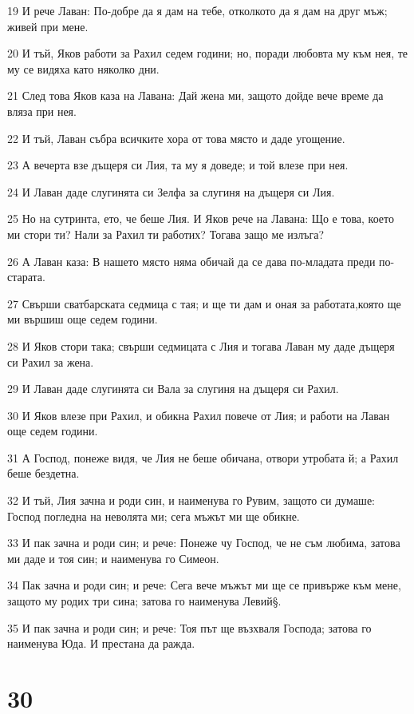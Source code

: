 \par 19 И рече Лаван: По-добре да я дам на тебе, отколкото да я дам на друг мъж; живей при мене.
\par 20 И тъй, Яков работи за Рахил седем години; но, поради любовта му към нея, те му се видяха като няколко дни.
\par 21 След това Яков каза на Лавана: Дай жена ми, защото дойде вече време да вляза при нея.
\par 22 И тъй, Лаван събра всичките хора от това място и даде угощение.
\par 23 А вечерта взе дъщеря си Лия, та му я доведе; и той влезе при нея.
\par 24 И Лаван даде слугинята си Зелфа за слугиня на дъщеря си Лия.
\par 25 Но на сутринта, ето, че беше Лия. И Яков рече на Лавана: Що е това, което ми стори ти? Нали за Рахил ти работих? Тогава защо ме излъга?
\par 26 А Лаван каза: В нашето място няма обичай да се дава по-младата преди по-старата.
\par 27 Свърши сватбарската седмица с тая; и ще ти дам и оная за работата,която ще ми вършиш още седем години.
\par 28 И Яков стори така; свърши седмицата с Лия и тогава Лаван му даде дъщеря си Рахил за жена.
\par 29 И Лаван даде слугинята си Вала за слугиня на дъщеря си Рахил.
\par 30 И Яков влезе при Рахил, и обикна Рахил повече от Лия; и работи на Лаван още седем години.
\par 31 А Господ, понеже видя, че Лия не беше обичана, отвори утробата й; а Рахил беше бездетна.
\par 32 И тъй, Лия зачна и роди син, и наименува го Рувим, защото си думаше: Господ погледна на неволята ми; сега мъжът ми ще обикне.
\par 33 И пак зачна и роди син; и рече: Понеже чу Господ, че не съм любима, затова ми даде и тоя син; и наименува го Симеон.
\par 34 Пак зачна и роди син; и рече: Сега вече мъжът ми ще се привърже към мене, защото му родих три сина; затова го наименува Левий§.
\par 35 И пак зачна и роди син; и рече: Тоя път ще възхваля Господа; затова го наименува Юда. И престана да ражда.

\chapter{30}

